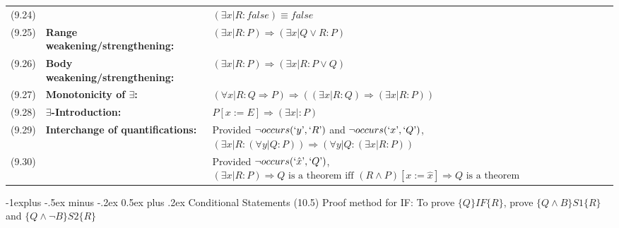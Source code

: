 \documentclass[letterpaper, 8pt]{extarticle}
\makeatletter
\renewcommand{\subsection}{\@startsection{subsection}{2}{0mm}%
                                {-1explus -.5ex minus -.2ex}%
                                {0.5ex plus .2ex}%
                                {\normalfont\small\bfseries}}
\newcommand{\To}{\Rightarrow}
\makeatother
\begin{document}
\begin{multicols*}{3}
\begin{tabulary}{\linewidth}{@{}lLL@{}}
        (9.24) &                                                    & $(\exists x | R : false) \equiv false$                                                                                                                                     \\
        (9.25) & \textbf{Range weakening/strengthening:}            & $(\exists x | R : P) \To (\exists x | Q \lor R : P)$                                                                                                                       \\
        (9.26) & \textbf{Body weakening/strengthening:}             & $(\exists x | R : P) \To (\exists x | R : P \lor Q)$                                                                                                                       \\
        (9.27) & \textbf{Monotonicity of $\exists$:}                & $(\forall x | R : Q \To P) \To ((\exists x | R : Q) \To (\exists x | R : P ))$                                                                                             \\
        (9.28) & \textbf{$\exists$-Introduction:}                   & $P[x := E] \To (\exists x |: P)$                                                                                                                                           \\
        (9.29) & \textbf{Interchange of quantifications:}           & Provided $\neg occurs(`y\textrm', `R\textrm')$ and $\neg occurs(`x\textrm', `Q\textrm')$, $(\exists x | R: (\forall y | Q : P)) \To (\forall y | Q : (\exists x | R : P))$ \\
        (9.30) &                                                    & Provided $\neg occurs(`\hat{x}\textrm', `Q\textrm')$, $(\exists x | R : P) \To Q \text{ is a theorem iff } (R \land P)[x := \hat{x}] \To Q \text{ is a theorem}$           \\
    \end{tabulary}

    \subsection{Conditional Statements}
    (10.5) Proof method for IF: To prove $\{Q\} IF \{R\}$, prove $\{Q \land B\} S1 \{R\}$ and $\{Q \land \neg B\} S2 \{R\}$




\end{multicols*}
\end{document}
